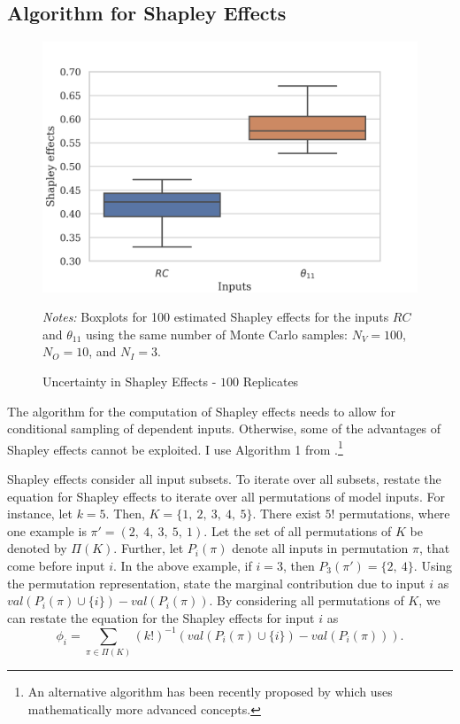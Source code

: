 \subsection{Algorithm for Shapley Effects} \label{comp_alg}

\begin{figure}[t]
	\caption{Uncertainty in Shapley Effects - $100$ Replicates}
    \label{boxplot_shapley}
	\begin{centering}
	\vspace*{-4mm}
	\begin{centering}
	\includegraphics[scale=0.9]{../figures/boxplot_shapley_effects_100.png}

	\end{centering}
	\end{centering}

	\small
	\textit{Notes:} Boxplots for 100 estimated Shapley effects for the inputs $RC$ and $\theta_{11}$ using the same number of Monte Carlo samples: $N_V=100$, $N_O=10$, and $N_I=3$.
\end{figure}

The algorithm for the computation of Shapley effects needs to allow for conditional sampling of dependent inputs. Otherwise, some of the advantages of Shapley effects cannot be exploited. I use Algorithm 1 from \citet{SNS16}.\footnote{An alternative algorithm has been recently proposed by \citet{PRB20} which uses mathematically more advanced concepts.}

Shapley effects consider all input subsets. To iterate over all subsets, \citet{SNS16} restate the equation for Shapley effects to iterate over all permutations of model inputs. For instance, let $k=5$. Then, $K=\{1,\ 2,\ 3,\ 4,\ 5\}$. There exist $5!$ permutations, where one example is $\pi'=(2,\ 4,\ 3,\ 5,\ 1)$. Let the set of all permutations of $K$ be denoted by $\Pi(K)$. Further, let $P_i(\pi)$ denote all inputs in permutation $\pi$, that come before input $i$. In the above example, if $i=3$, then $P_3(\pi')=\{2,\ 4\}$. Using the permutation representation, \citet{SNS16} state the marginal contribution due to input $i$ as $val(P_i(\pi) \cup\{i\}) - val(P_i(\pi))$. By considering all permutations of $K$, we can restate the equation for the Shapley effects for input $i$ as
\begin{equation*}
\phi_i=\sum_{\pi \in \Pi(K)} (k!)^{-1} (val(P_i(\pi) \cup\{i\}) - val(P_i(\pi))).
\end{equation*}

